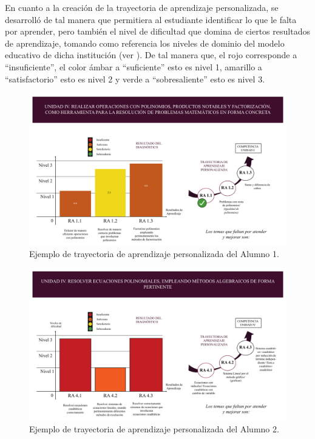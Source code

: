 \documentclass[spanish]{textolivre}
\begin{document}
En cuanto a la creación de la trayectoria de aprendizaje personalizada, se desarrolló de tal manera que permitiera al estudiante identificar lo que le falta por aprender, pero también el nivel de dificultad que domina de ciertos resultados de aprendizaje, tomando como referencia los niveles de dominio del modelo educativo de dicha institución (ver ). De tal manera que, el rojo corresponde a “insuficiente”, el color ámbar a “suficiente” esto es nivel 1, amarillo a “satisfactorio” esto es nivel 2 y verde a “sobresaliente” esto es nivel 3.

\begin{figure}[h!]
   \centering
   \includegraphics[width=1\textwidth]{fig-05.pdf}
   \caption{Ejemplo de trayectoria de aprendizaje personalizada del Alumno 1.}
   \label{fig:05}
\end{figure}

\begin{figure}[h!]
   \centering
   \includegraphics[width=1\textwidth]{fig-06.pdf}
   \caption{Ejemplo de trayectoria de aprendizaje personalizada del Alumno 2.}
   \label{fig:06}
\end{figure}
\end{document}
